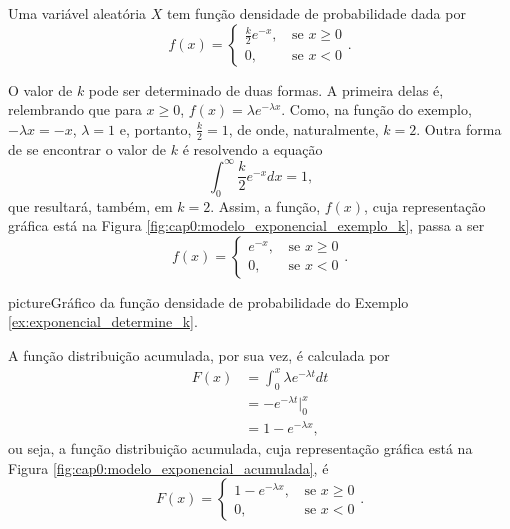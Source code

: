 \documentclass[11pt,fleqn]{book}
\numberwithin{mpicture}{chapter}
\numberwithin{mtable}{chapter}
\numberwithin{mframe}{chapter}
\begin{document}
\begin{example}
	\label{ex:exponencial_determine_k}
	Uma variável aleatória $X$ tem função densidade de probabilidade dada por
	\[
		f(x)=\begin{cases}
			\frac{k}{2}e^{-x}\text{,}&\text{ se }x\geqslant 0\\
			0\text{,}&\text{ se }x<0
		\end{cases}
		\text{.}
	\]
	
	O valor de $k$ pode ser determinado de duas formas. A primeira delas é, relembrando que para $x\geqslant 0$, $f(x)=\lambda e^{-\lambda x}$. Como, na função do exemplo, $-\lambda x=-x$, $\lambda=1$ e, portanto, $\frac{k}{2}=1$, de onde, naturalmente, $k=2$. Outra forma de se encontrar o valor de $k$ é resolvendo a equação
	\[
		\int_{0}^{\infty} \frac{k}{2}e^{-x}dx=1
		\text{,}
	\]
	que resultará, também, em $k=2$. Assim, a função, $f(x)$, cuja representação gráfica está na Figura \ref{fig:cap0:modelo_exponencial_exemplo_k}, passa a ser
	\[
		f(x)=\begin{cases}
			e^{-x}\text{,}&\text{ se }x\geqslant 0\\
			0\text{,}&\text{ se }x<0
		\end{cases}
		\text{.}
	\]
\end{example}

\begin{sidepicture}{0cm}{picture}{Gráfico da função densidade de probabilidade do Exemplo \ref{ex:exponencial_determine_k}.}
	\label{fig:cap0:modelo_exponencial_exemplo_k}
\end{sidepicture}

A função distribuição acumulada, por sua vez, é calculada por
\begin{align*}
	F(x)&=\int_{0}^{x} \lambda e^{-\lambda t} dt\\
		&=-e^{-\lambda t}\Big|_{0}^{x}\\
		&=1-e^{-\lambda x}\text{,}
\end{align*}
ou seja, a função distribuição acumulada, cuja representação gráfica está na Figura \ref{fig:cap0:modelo_exponencial_acumulada}, é
\[
	F(x)=\begin{cases}
		1-e^{-\lambda x}\text{,}&\text{ se }x\geqslant 0\\
		0\text{,}&\text{ se }x<0
	\end{cases}
	\text{.}
\]
\end{document}

